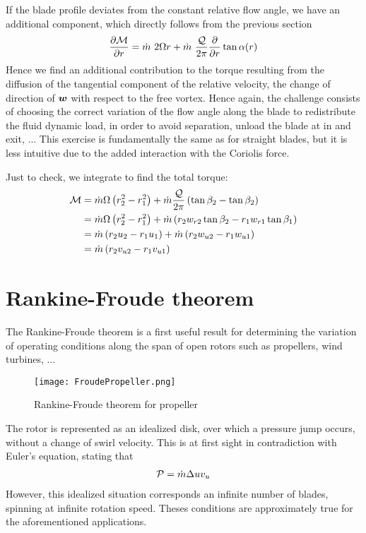If the blade profile deviates from the constant relative flow angle,
we have an additional component, which directly follows from the
previous section
\begin{align*}
  \frac{\partial \mathcal M}{\partial r} = \dot m ~2 \Omega r + \dot m ~\frac{\mathcal Q}{2 \pi}
  \frac{\partial }{\partial r} \tan \alpha(r)
\end{align*}
Hence we find an additional contribution to the torque resulting from
the diffusion of the tangential component of the relative velocity,
\ie the change of direction of $\boldsymbol {w}$ with respect to the free
vortex. Hence again, the challenge consists of choosing the correct
variation of the flow angle along the blade to redistribute the fluid
dynamic load, \eg in order to avoid separation, unload the blade at in
and exit, ... This exercise is fundamentally the same as for straight
blades, but it is less intuitive due to the added interaction with the
Coriolis force.

Just to check, we integrate to find the total torque:
\begin{align*}
  \mathcal M 
  &= \dot m \Omega \left(r_2^2 - r_1^2\right) + \dot m \frac{\mathcal Q}{2\pi} \left(\tan \beta_2 - \tan \beta_2\right) \\
  &= \dot m \Omega \left(r_2^2 - r_1^2\right) + \dot m \left(r_2 w_{r2} \tan \beta_2 - r_1 w_{r1} \tan \beta_1\right) \\
  &= \dot m \left(r_2 u_2 - r_1 u_1 \right) + \dot m \left(r_2 w_{u 2} - r_1 w_{u 1}\right) \\
  &= \dot m \left(r_2 v_{u 2} - r_1 v_{u 1}\right)
\end{align*}

\section{Rankine-Froude theorem}
\label{sec:rankineFroude}

The Rankine-Froude theorem is a first useful result for determining
the variation of operating conditions along the span of open rotors
such as propellers, wind turbines, ... 
\begin{figure}[!h]
  \centering
  \texttt{[image: FroudePropeller.png]}
  \caption{Rankine-Froude theorem for propeller}
  \label{fig:rankineFroude}
\end{figure}
The rotor is represented as an idealized disk, over which a pressure
jump occurs, without a change of swirl velocity. This is at first
sight in contradiction with Euler's equation, stating that
\begin{align*}
  \mathcal P = \dot m \Delta u v_u
\end{align*}
However, this idealized situation corresponds an infinite number of
blades, spinning at infinite rotation speed. Theses conditions are
approximately true for the aforementioned applications.

